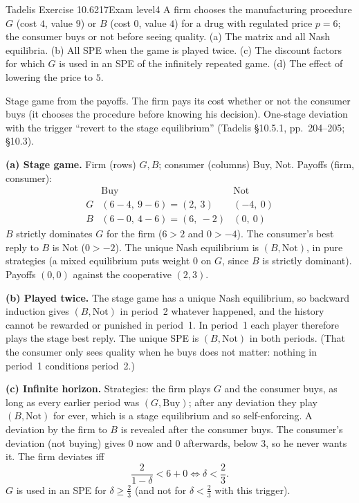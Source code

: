 \begin{exsol}{Tadelis Exercise 10.6}{217}{Exam level}{4}
\asked A firm chooses the manufacturing procedure $G$ (cost $4$, value $9$) or $B$ (cost $0$, value $4$) for a drug
with regulated price $p = 6$; the consumer buys or not before seeing quality. (a) The matrix and all Nash
equilibria. (b) All SPE when the game is played twice. (c) The discount factors for which $G$ is used in an SPE
of the infinitely repeated game. (d) The effect of lowering the price to $5$.

\method Stage game from the payoffs. The firm pays its cost whether or not the consumer buys (it chooses the
procedure before knowing his decision). One-stage deviation with the trigger ``revert to the stage equilibrium''
(Tadelis \S10.5.1, pp.~204--205; \S10.3).

\solution
\textbf{(a) Stage game.} Firm (rows) $G, B$; consumer (columns) Buy, Not. Payoffs (firm, consumer):
\[
\begin{array}{c|cc}
 & \text{Buy} & \text{Not} \\ \hline
G & (6-4,\ 9-6) = (2,\ 3) & (-4,\ 0) \\
B & (6-0,\ 4-6) = (6,\ -2) & (0,\ 0)
\end{array}
\]
$B$ strictly dominates $G$ for the firm ($6 > 2$ and $0 > -4$). The consumer's best reply to $B$ is Not ($0 > -2$).
The unique Nash equilibrium is $(B, \text{Not})$, in pure strategies (a mixed equilibrium puts weight $0$ on $G$,
since $B$ is strictly dominant). Payoffs $(0,0)$ against the cooperative $(2,3)$.

\textbf{(b) Played twice.} The stage game has a unique Nash equilibrium, so backward induction gives
$(B, \text{Not})$ in period~2 whatever happened, and the history cannot be rewarded or punished in period~1. In
period~1 each player therefore plays the stage best reply. The unique SPE is $(B,\text{Not})$ in both periods.
(That the consumer only sees quality when he buys does not matter: nothing in period~1 conditions period~2.)

\textbf{(c) Infinite horizon.} Strategies: the firm plays $G$ and the consumer buys, as long as every earlier
period was $(G, \text{Buy})$; after any deviation they play $(B, \text{Not})$ for ever, which is a stage equilibrium
and so self-enforcing. A deviation by the firm to $B$ is revealed after the consumer buys. The consumer's
deviation (not buying) gives $0$ now and $0$ afterwards, below $3$, so he never wants it. The firm deviates iff
\[
  \frac{2}{1-\delta} < 6 + 0 \iff \delta < \frac23 .
\]
$G$ is used in an SPE for $\delta \ge \frac23$ (and not for $\delta < \frac23$ with this trigger).


\end{exsol}
